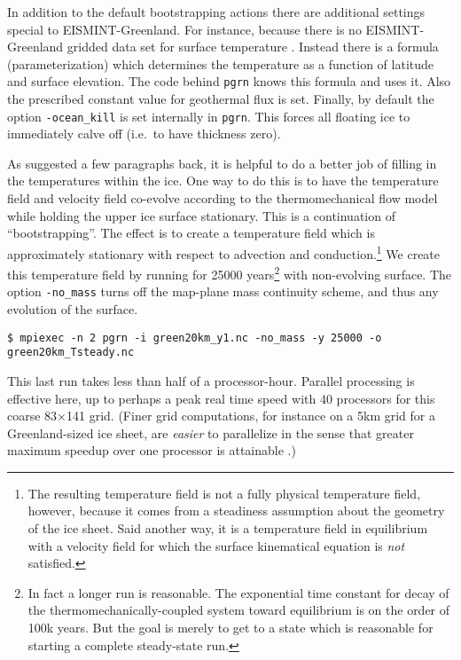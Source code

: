 In addition to the default bootstrapping actions there are additional settings special to EISMINT-Greenland.  For instance, because there is no EISMINT-Greenland gridded data set for surface temperature \cite{RitzEISMINT}.  Instead there is a formula (parameterization) which determines the temperature as a function of latitude and surface elevation.  The code behind \texttt{pgrn} knows this formula and uses it.  Also the prescribed constant value for geothermal flux is set.  Finally, by default the option \texttt{-ocean_kill} is set internally in \texttt{pgrn}.  This forces all floating ice to immediately calve off (i.e.~to have thickness zero).

As suggested a few paragraphs back, it is helpful to do a better job of filling in the temperatures within the ice.  One way to do this is to have the temperature field and velocity field co-evolve according to the thermomechanical flow model while holding the upper ice surface stationary.  This is a continuation of ``bootstrapping''.  The effect is to create a temperature field which is approximately stationary with respect to advection and conduction.\footnote{The resulting temperature field is not a fully physical temperature field, however, because it comes from a steadiness assumption about the geometry of the ice sheet.  Said another way, it is a temperature field in equilibrium with a velocity field for which the surface kinematical equation \cite{Fowler} is \emph{not} satisfied.}  We create this temperature field by running for 25000 years\footnote{In fact a longer run is reasonable.  The exponential time constant for decay of the thermomechanically-coupled system toward equilibrium is on the order of 100k years.  But the goal is merely to get to a state which is reasonable for starting a complete steady-state run.} with non-evolving surface.  The option \texttt{-no_mass} turns off the map-plane mass continuity scheme, and thus any evolution of the surface.

\begin{verbatim}
$ mpiexec -n 2 pgrn -i green20km_y1.nc -no_mass -y 25000 -o green20km_Tsteady.nc
\end{verbatim}%
\noindent This last run takes less than half of a processor-hour.  Parallel processing is effective here, up to perhaps a peak real time speed with 40 processors for this coarse 83$\times$141 grid.  (Finer grid computations, for instance on a 5km grid for a Greenland-sized ice sheet, are \emph{easier} to parallelize in the sense that greater maximum speedup over one processor is attainable \cite{BBssasliding}.)

